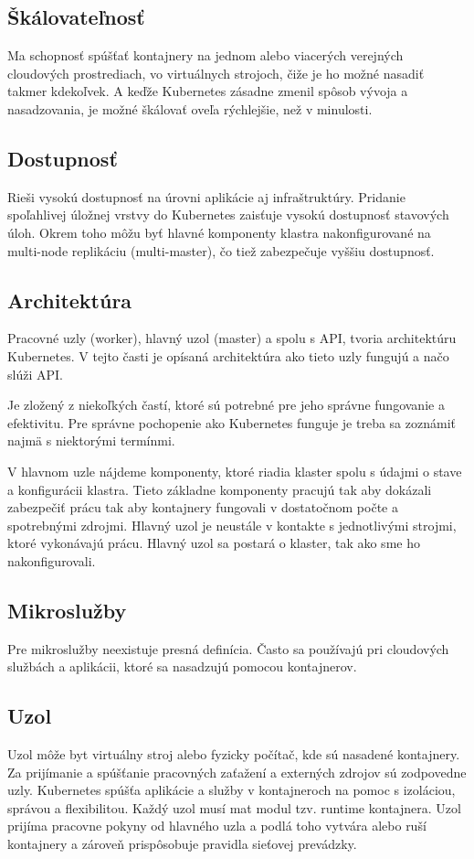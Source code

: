 \subsection*{Škálovateľnosť}
Ma schopnosť spúšťať kontajnery na jednom alebo viacerých verejných cloudových prostrediach, vo virtuálnych strojoch, čiže je ho možné nasadiť takmer kdekoľvek. A keďže Kubernetes zásadne zmenil spôsob vývoja a nasadzovania, je možné škálovať oveľa rýchlejšie, než v minulosti.

\subsection*{Dostupnosť}
Rieši vysokú dostupnosť na úrovni aplikácie aj infraštruktúry. Pridanie spoľahlivej úložnej vrstvy do Kubernetes zaisťuje vysokú dostupnosť stavových úloh. Okrem toho môžu byť hlavné komponenty klastra nakonfigurované na multi-node replikáciu (multi-master), čo tiež zabezpečuje vyššiu dostupnosť.

\subsection{Architektúra}
Pracovné uzly (worker), hlavný uzol (master) a spolu s API, tvoria architektúru Kubernetes. V tejto časti je opísaná architektúra ako tieto uzly fungujú a načo slúži API.

Je zložený z niekoľkých častí, ktoré sú potrebné pre jeho správne fungovanie a efektivitu. Pre správne pochopenie ako Kubernetes funguje je treba sa zoznámiť najmä s niektorými termínmi.

V hlavnom uzle nájdeme komponenty, ktoré riadia klaster spolu s údajmi o stave a konfigurácii klastra. Tieto základne komponenty pracujú tak aby dokázali zabezpečiť prácu tak aby kontajnery fungovali v dostatočnom počte a spotrebnými zdrojmi.
Hlavný uzol je neustále v kontakte s jednotlivými strojmi, ktoré vykonávajú prácu. Hlavný uzol sa postará o klaster, tak ako sme ho nakonfigurovali.



\subsection*{Mikroslužby}
Pre mikroslužby neexistuje presná definícia. Často sa používajú pri cloudových službách a aplikácii, ktoré sa nasadzujú pomocou kontajnerov.  

\subsection*{Uzol}
Uzol môže byt virtuálny stroj alebo fyzicky počítač, kde sú nasadené kontajnery. Za prijímanie a spúšťanie pracovných zaťažení a externých zdrojov sú zodpovedne uzly. Kubernetes spúšťa aplikácie a služby v kontajneroch na pomoc s izoláciou, správou a flexibilitou. Každý uzol musí mat modul tzv. runtime kontajnera. Uzol prijíma pracovne pokyny od hlavného uzla a podlá toho vytvára alebo ruší kontajnery a zároveň prispôsobuje pravidla sieťovej prevádzky.

